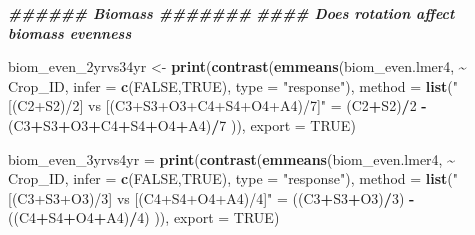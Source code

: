 \documentclass[
]{article}
\newenvironment{Shaded}{\begin{snugshade}}{\end{snugshade}}
\newcommand{\AttributeTok}[1]{\textcolor[rgb]{0.13,0.29,0.53}{#1}}
\newcommand{\ConstantTok}[1]{\textcolor[rgb]{0.56,0.35,0.01}{#1}}
\newcommand{\DecValTok}[1]{\textcolor[rgb]{0.00,0.00,0.81}{#1}}
\newcommand{\DocumentationTok}[1]{\textcolor[rgb]{0.56,0.35,0.01}{\textbf{\textit{#1}}}}
\newcommand{\FunctionTok}[1]{\textcolor[rgb]{0.13,0.29,0.53}{\textbf{#1}}}
\newcommand{\NormalTok}[1]{#1}
\newcommand{\OtherTok}[1]{\textcolor[rgb]{0.56,0.35,0.01}{#1}}
\newcommand{\SpecialCharTok}[1]{\textcolor[rgb]{0.81,0.36,0.00}{\textbf{#1}}}
\newcommand{\StringTok}[1]{\textcolor[rgb]{0.31,0.60,0.02}{#1}}
\begin{document}
\begin{Shaded}
\begin{Highlighting}[]
\DocumentationTok{\#\#\#\#\#\# Biomass \#\#\#\#\#\#\#}
\DocumentationTok{\#\#\#\# Does rotation affect biomass evenness }

\NormalTok{biom\_even\_2yrvs34yr }\OtherTok{\textless{}{-}} \FunctionTok{print}\NormalTok{(}\FunctionTok{contrast}\NormalTok{(}\FunctionTok{emmeans}\NormalTok{(biom\_even.lmer4, }\SpecialCharTok{\textasciitilde{}}\NormalTok{ Crop\_ID,}
                                              \AttributeTok{infer =} \FunctionTok{c}\NormalTok{(}\ConstantTok{FALSE}\NormalTok{,}\ConstantTok{TRUE}\NormalTok{),}
                                              \AttributeTok{type =} \StringTok{"response"}\NormalTok{),}
                                      \AttributeTok{method =} \FunctionTok{list}\NormalTok{(}\StringTok{"[(C2+S2)/2] vs [(C3+S3+O3+C4+S4+O4+A4)/7]"} \OtherTok{=}
\NormalTok{                                                      (C2}\SpecialCharTok{+}\NormalTok{S2)}\SpecialCharTok{/}\DecValTok{2} \SpecialCharTok{{-}}\NormalTok{ (C3}\SpecialCharTok{+}\NormalTok{S3}\SpecialCharTok{+}\NormalTok{O3}\SpecialCharTok{+}\NormalTok{C4}\SpecialCharTok{+}\NormalTok{S4}\SpecialCharTok{+}\NormalTok{O4}\SpecialCharTok{+}\NormalTok{A4)}\SpecialCharTok{/}\DecValTok{7}\NormalTok{ )),}
                             \AttributeTok{export =} \ConstantTok{TRUE}\NormalTok{)}


\NormalTok{biom\_even\_3yrvs4yr }\OtherTok{=} \FunctionTok{print}\NormalTok{(}\FunctionTok{contrast}\NormalTok{(}\FunctionTok{emmeans}\NormalTok{(biom\_even.lmer4, }\SpecialCharTok{\textasciitilde{}}\NormalTok{ Crop\_ID,}
                                            \AttributeTok{infer =} \FunctionTok{c}\NormalTok{(}\ConstantTok{FALSE}\NormalTok{,}\ConstantTok{TRUE}\NormalTok{), }
                                            \AttributeTok{type =} \StringTok{"response"}\NormalTok{), }
                                    \AttributeTok{method =} \FunctionTok{list}\NormalTok{(}\StringTok{"[(C3+S3+O3)/3] vs [(C4+S4+O4+A4)/4]"} \OtherTok{=} 
\NormalTok{                                                    ((C3}\SpecialCharTok{+}\NormalTok{S3}\SpecialCharTok{+}\NormalTok{O3)}\SpecialCharTok{/}\DecValTok{3}\NormalTok{) }\SpecialCharTok{{-}}\NormalTok{ ((C4}\SpecialCharTok{+}\NormalTok{S4}\SpecialCharTok{+}\NormalTok{O4}\SpecialCharTok{+}\NormalTok{A4)}\SpecialCharTok{/}\DecValTok{4}\NormalTok{) )), }
                           \AttributeTok{export =} \ConstantTok{TRUE}\NormalTok{)}



\end{Highlighting}
\end{Shaded}
\end{document}
